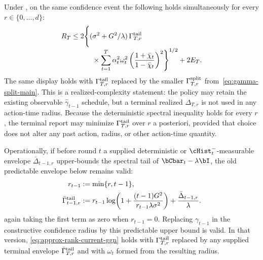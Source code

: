 \begin{corollary}
\label{cor:approx-rank-current-ggn}
Under , on the same confidence event
the following holds simultaneously for every $r\in\{0,\ldots,d\}$:
\begin{equation}\label{eq:approx-rank-current-ggn}
\begin{aligned}
 R_T&\le 2\Biggl\{(\sigma^2+G^2/\lambda)\,
 \Gamma^{\rm tail}_{T,r}\\[-1mm]
 &\qquad\quad\times\sum_{t=1}^T\alpha_t^2\omega_t^2
 \left(\frac{1+\bar\chi_t}{1-\bar\chi_t}\right)^2\Biggr\}^{1/2}
 +2E_T.
\end{aligned}
\end{equation}
The same display holds with $\Gamma^{\rm tail}_{T,r}$ replaced by the
smaller $\Gamma^{\rm split}_{T,r}$ from~\eqref{eq:gamma-split-main}.
This is a realized-complexity statement: the policy may retain the existing
observable $\hat\gamma_{t-1}$ schedule, but a terminal realized
$\Delta_{T,r}$ is not used in any action-time radius.  Because the deterministic
spectral inequality holds for every $r$, the terminal report may minimize
$\Gamma^{\rm tail}_{T,r}$ over $r$ a posteriori, provided that choice does not
alter any past action, radius, or other action-time quantity.

Operationally, if before round $t$ a supplied deterministic or
$\cHist_t^-$-measurable envelope $\bar\Delta_{t-1,r}$ upper-bounds the spectral
tail of $\bCbar_t-\lambda\bI$, the old predictable envelope below remains
valid:
\[
\begin{aligned}
 r_{t-1}&:=\min\{r,t-1\},\\
 \bar\Gamma^{\rm tail}_{t-1,r}
 &:=r_{t-1}\log\!\left(1+\frac{(t-1)G^2}
 {r_{t-1}\lambda\sigma^2}\right)
 +\frac{\bar\Delta_{t-1,r}}\lambda.
\end{aligned}
\]
again taking the first term as zero when $r_{t-1}=0$.
Replacing $\gamma_{t-1}$ in the constructive confidence radius by this
predictable upper bound is valid.  In that version,
\eqref{eq:approx-rank-current-ggn} holds with
$\Gamma^{\rm tail}_{T,r}$ replaced by any supplied terminal envelope
$\bar\Gamma^{\rm tail}_{T,r}$ and with $\omega_t$ formed from the resulting
radius.


\end{corollary}

